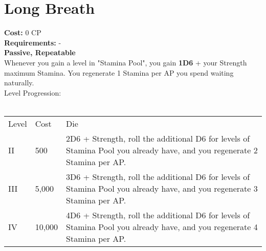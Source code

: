 \section{Long Breath}\label{sec:longbreath}
\textbf{Cost:} 0 CP\\
\textbf{Requirements:} -\\
\textbf{Passive, Repeatable}\\
Whenever you gain a level in "Stamina Pool", you gain \textbf{1D6} + your Strength maximum Stamina.
You regenerate 1 Stamina per AP you spend waiting naturally.
\\
Level Progression:\\
\\
\begin{tabular}{l | l | p{12cm} }
	Level & Cost & Die\\
	II & 500 & 2D6 + Strength, roll the additional D6 for levels of Stamina Pool you already have, and you regenerate 2 Stamina per AP. \\
	III & 5,000 & 3D6 + Strength, roll the additional D6 for levels of Stamina Pool you already have, and you regenerate 3 Stamina per AP. \\
	IV & 10,000 & 4D6 + Strength, roll the additional D6 for levels of Stamina Pool you already have, and you regenerate 4 Stamina per AP.\\
\end{tabular}